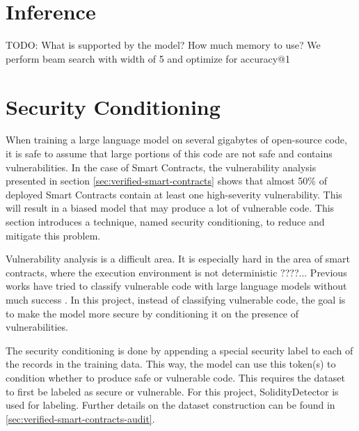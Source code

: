 \section{Inference}

TODO: What is supported by the model? How much memory to use?
We perform beam search with width of 5 and optimize for accuracy@1


\section{Security Conditioning}
\label{sec:security-conditioning}
When training a large language model on several gigabytes of open-source code, it is safe to assume that large portions of this code are not safe and contains vulnerabilities. In the case of Smart Contracts, the vulnerability analysis presented in section \ref{sec:verified-smart-contracts} shows that almost 50\% of deployed Smart Contracts contain at least one high-severity vulnerability. This will result in a biased model that may produce a lot of vulnerable code. This section introduces a technique, named security conditioning, to reduce and mitigate this problem.

Vulnerability analysis is a difficult area. It is especially hard in the area of smart contracts, where the execution environment is not deterministic ????... Previous works have tried to classify vulnerable code with large language models without much success . In this project, instead of classifying vulnerable code, the goal is to make the model more secure by conditioning it on the presence of vulnerabilities.

The security conditioning is done by appending a special security label to each of the records in the training data. This way, the model can use this token(s) to condition whether to produce safe or vulnerable code. This requires the dataset to first be labeled as secure or vulnerable. For this project, SolidityDetector is used for labeling. Further details on the dataset construction can be found in \cref{sec:verified-smart-contracts-audit}.

